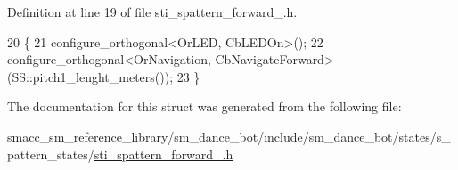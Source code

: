 Definition at line 19 of file sti\+\_\+spattern\+\_\+forward\+\_.\+h.


\begin{DoxyCode}
20   \{
21     configure\_orthogonal<OrLED, CbLEDOn>();
22     configure\_orthogonal<OrNavigation, CbNavigateForward>(SS::pitch1\_lenght\_meters());
23   \}
\end{DoxyCode}


The documentation for this struct was generated from the following file\+:\begin{DoxyCompactItemize}
\item 
smacc\+\_\+sm\+\_\+reference\+\_\+library/sm\+\_\+dance\+\_\+bot/include/sm\+\_\+dance\+\_\+bot/states/s\+\_\+pattern\+\_\+states/\hyperlink{include_2sm__dance__bot_2states_2s__pattern__states_2sti__spattern__forward__1_8h}{sti\+\_\+spattern\+\_\+forward\+\_.\+h}\end{DoxyCompactItemize}
